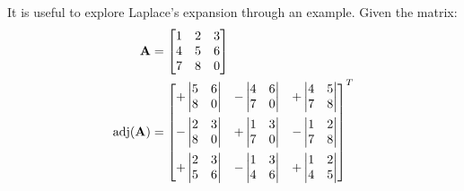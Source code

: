 \documentclass{article}%
\begin{document}
\begin{multicols}{2}
It is useful to explore Laplace's expansion through an example. Given the matrix:
\begin{align}
\matA &= \begin{bmatrix} 1& 2& 3\\ 4& 5& 6\\ 7& 8& 0\\ \end{bmatrix} \label{mA} \\
\adj(\matA) &= \begin{bmatrix}
 +\begin{vmatrix} 5& 6\\ 8& 0\\ \end{vmatrix} & 
 -\begin{vmatrix} 4& 6\\ 7& 0\\ \end{vmatrix} & 
 +\begin{vmatrix} 4& 5\\ 7& 8\\ \end{vmatrix}
\vspace{1ex}\\
 -\begin{vmatrix} 2& 3\\ 8& 0\\ \end{vmatrix} & 
 +\begin{vmatrix} 1& 3\\ 7& 0\\ \end{vmatrix} & 
 -\begin{vmatrix} 1& 2\\ 7& 8\\ \end{vmatrix}
\vspace{1ex}\\
 +\begin{vmatrix} 2& 3\\ 5& 6\\ \end{vmatrix} & 
 -\begin{vmatrix} 1& 3\\ 4& 6\\ \end{vmatrix} & 
 +\begin{vmatrix} 1& 2\\ 4& 5\\ \end{vmatrix}
\end{bmatrix}^T \\

\end{align}
\end{multicols}
\end{document}
